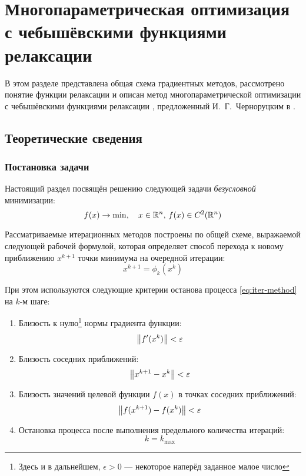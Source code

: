\section{Многопараметрическая оптимизация\\
  с чебышёвскими функциями релаксации}
\label{sec:relch}

В этом разделе представлена общая схема градиентных методов,
рассмотрено понятие функции релаксации и описан метод
многопараметрической оптимизации с чебышёвскими функциями релаксации
\relch, предложенный И. Г. Черноруцким в
\cite{chernorutsky04}.

\subsection{Теоретические сведения}

\subsubsection{Постановка задачи}

Настоящий раздел посвящён решению следующей задачи \emph{безусловной}
минимизации:
\begin{equation}
  \label{eq:optim-problem-form}
  f(x) \to \min,\quad x \in \mathbb{R}^n,\, f(x) \in C^2(\mathbb{R}^n)
\end{equation}

Рассматриваемые итерационных методов построены по общей схеме,
выражаемой следующей рабочей формулой, которая определяет способ
перехода к новому приближению $x^{k+1}$ точки минимума на очередной
итерации:
\begin{equation}
  \label{eq:iter-method}
  x^{k+1} = \phi_k(x^k)
\end{equation}

При этом используются следующие критерии останова процесса
\eqref{eq:iter-method} на $k$-м шаге:
\begin{enumerate}
\item Близость к нулю\footnote[1]{Здесь и в дальнейшем, $\epsilon>0$ —
    некоторое наперёд заданное малое число} нормы градиента функции:
  \begin{equation*}
  \left \lVert{f'(x^k)}\right \rVert < \varepsilon
\end{equation*}

\item Близость соседних приближений:
  \begin{equation*}
    \left \lVert{x^{k+1}-x^k}\right \rVert < \varepsilon
  \end{equation*}
  
\item Близость значений целевой функции $f(x)$ в точках соседних
  приближений:
  \begin{equation*}
    \left \lVert{f(x^{k+1}) - f(x^k)}\right \rVert < \varepsilon
  \end{equation*}
\item Остановка процесса после выполнения предельного количества
  итераций:
  \begin{equation*}
    k = k_{\max}
  \end{equation*}
  
\end{enumerate}

